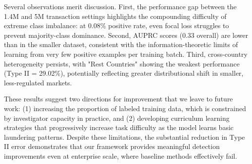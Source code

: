 \documentclass[11pt,english]{article}
\begin{document}
Several observations merit discussion. First, the performance gap between the 1.4M and 5M transaction settings highlights the compounding difficulty of extreme class imbalance: at 0.08\% positive rate, even focal loss struggles to prevent majority-class dominance. Second, AUPRC scores (0.33 overall) are lower than in the smaller dataset, consistent with the information-theoretic limits of learning from very few positive examples per training batch. Third, cross-country heterogeneity persists, with "Rest Countries" showing the weakest performance (Type II = 29.02\%), potentially reflecting greater distributional shift in smaller, less-regulated markets.

 
These results suggest two directions for improvement that we leave to future work: (1) increasing the proportion of labeled training data, which is constrained by investigator capacity in practice, and (2) developing curriculum learning strategies that progressively increase task difficulty as the model learns basic laundering patterns. Despite these limitations, the substantial reduction in Type II error demonstrates that our framework provides meaningful detection improvements even at enterprise scale, where baseline methods effectively fail.

\begin{table}[ht!]
\centering
\caption{Performance Comparison Between Our Method and the Baseline Method (GNN with Focal Loss)}
\small
{}
\label{scalability_analysis}
\end{table}
\end{document}
